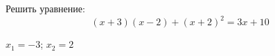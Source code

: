 \begin{ex}
	Решить уравнение:
	$$ (x+3)(x-2)+(x+2)^2=3x+10 $$
	\begin{answer}
		$x_1=-3$; $x_2=2$
	\end{answer}
\end{ex}